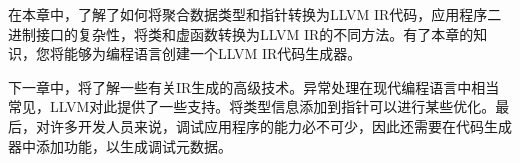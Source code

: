 在本章中，了解了如何将聚合数据类型和指针转换为LLVM IR代码，应用程序二进制接口的复杂性，将类和虚函数转换为LLVM IR的不同方法。有了本章的知识，您将能够为编程语言创建一个LLVM IR代码生成器。

下一章中，将了解一些有关IR生成的高级技术。异常处理在现代编程语言中相当常见，LLVM对此提供了一些支持。将类型信息添加到指针可以进行某些优化。最后，对许多开发人员来说，调试应用程序的能力必不可少，因此还需要在代码生成器中添加功能，以生成调试元数据。